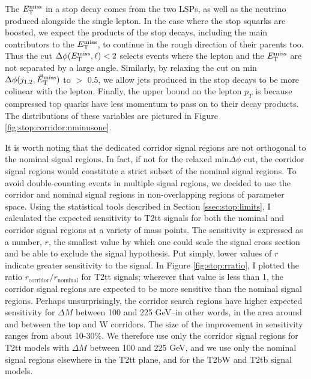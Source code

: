 The $E_\text{T}^\text{miss}$ in a stop decay comes from the two LSPs, as well as the
neutrino produced alongside the single lepton. In the case where the
stop squarks are boosted, we expect the products of the stop decays,
including the main contributors to the
$E_\text{T}^\text{miss}$, to continue in the rough direction of their parents too. Thus the cut
$\Delta\phi (E_\text{T}^\text{miss}, \ell) < 2$ selects events where the lepton and the
$E_\text{T}^\text{miss}$ are not separated by a large angle. Similarly, by relaxing
the cut on min$\Delta \phi(j_{1,2},\vec{E}_\text{T}^\text{miss})$ to $>$ 0.5, we allow jets
produced in the stop decays to be more colinear with the lepton.
Finally, the upper bound on the lepton $p_T$ is because compressed top
quarks have less momentum to pass on to their decay products.
The distributions of these variables are pictured in Figure
\ref{fig:stop:corridor:nminusone}.

It is worth noting that the dedicated corridor signal regions are not
orthogonal to the nominal signal regions. In fact, if not for the
relaxed min$\Delta\phi$ cut, the corridor signal regions would
constitute a strict subset of the nominal signal regions. To avoid
double-counting events in multiple signal regions, we decided to use
the corridor and nominal signal regions in non-overlapping regions of
parameter space. Using the statistical tools described in Section
\ref{ssec:stop:limits}, I calculated the expected sensitivity to T2tt
signals for both the nominal and corridor signal regions at a variety
of mass points. The sensitivity is expressed as a number, $r$, the
smallest value by which one could scale the signal cross section and
be able to exclude the signal hypothesis. Put simply, lower values
of $r$ indicate greater sensitivity to the signal. In Figure
\ref{fig:stop:rratio}, I plotted the ratio
$r_\text{corridor} / r_\text{nominal}$ for T2tt signals; wherever that value is less
than 1, the corridor signal regions are expected to be more sensitive
than the nominal signal regions. Perhaps unsurprisingly, the corridor search
regions have higher expected sensitivity for $\Delta M$ between 100 and
225 GeV--in other words, in the area around and between the top and W
corridors. The size of the improvement in sensitivity ranges from
about 10-30\%. We therefore use only the corridor signal regions for
T2tt models with $\Delta M$ between 100 and 225 GeV, and we use only
the nominal signal regions elsewhere in the T2tt plane, and for the
T2bW and T2tb signal models.

